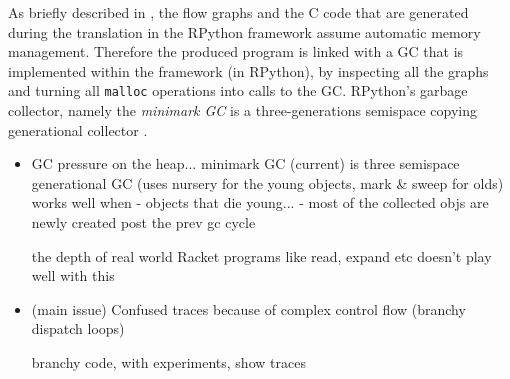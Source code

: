 As briefly described in , the flow graphs and
the C code that are generated during the translation in the RPython
framework assume automatic memory management. Therefore the produced
program is linked with a GC that is implemented within the framework
(in RPython), by inspecting all the graphs and turning all
\texttt{malloc} operations into calls to the GC. RPython's garbage
collector, namely the \emph{minimark GC} is a three-generations
semispace copying generational collector \cite{pypy06, bolz:14,
  gc:16}.

\begin{itemize}
\item GC pressure on the heap... minimark GC (current) is three semispace generational GC (uses nursery for the young objects, mark \& sweep for olds)
  works well when
  - objects that die young...
  - most of the collected objs are newly created post the prev gc cycle


  the depth of real world Racket programs like
  read, expand etc doesn't play well with this

\item (main issue) Confused traces because of complex control flow
  (branchy dispatch loops)

  branchy code, with experiments, show traces

\end{itemize}
